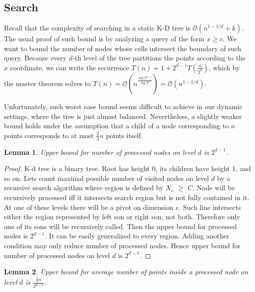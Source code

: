 \documentclass[10pt,a4paper]{article}
\newtheorem{lemma}{Lemma}
\newcommand{\Oh}{\mathcal{O}}
\begin{document}
\subsection{Search}

Recall that the complexity of searching in a static K-D tree is $\Oh(n^{1-1/d} + k)$. The usual proof of such bound is by analyzing a query of the form $x \geq c$. We want to bound the number of nodes whose cells intersect the boundary of such query. Because every $d$-th level of the tree partitions the points according to the $x$ coordinate, we can write the recurrence $T(n)=1+2^{d-1}T(\frac{n}{2^{d}})$, which by the master theorem solves to $T(n)=\Oh(n^{\frac{\log 2^{d-1}}{\log 2^{d}}})=\Oh(n^{1-1/d})$. 

Unfortunately, such worst case bound seems difficult to achieve in our dynamic settings, where the tree is just almost balanced. Nevertheless, a slightly weaker bound holds under the assumption that a child of a node corresponding to $n$ points corresponds to at most $\frac{2}{3}n$ points itself.

\begin{lemma}\label{lem:3}
Upper bound for number of processed nodes on level $d$ is $2^{d-1}$.
\end{lemma}

\begin{proof}

K-d tree is a binary tree. Root has height 0, its children have height 1, and so on. Lets count maximal possible number of visited nodes on level $d$ by a recursive search algorithm where region is defined by $X_e$ $\geq$ $C$. Node will be recursively processed iff it intersects search region but is not fully contained in it. At one of these levels there will be a pivot on dimension $e$. Such line intersects either the region represented by left son or right son, not both. Therefore only one of its sons will be recursively called. Then the upper bound for processed nodes is $2^{d-1}$. It can be easily generalized to every region. Adding another condition may only reduce number of processed nodes. Hence upper bound for number of processed nodes on level $d$ is $2^{d-1}$. 

\end{proof}


\begin{lemma}\label{lem:4}
Upper bound for average number of points inside a processed node on level $d$ is $\frac{\frac{2}{3}n}{2^{d-1}}$.
\end{lemma}
\end{document}
